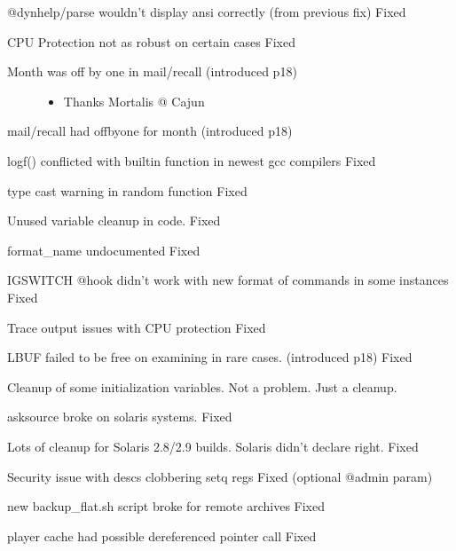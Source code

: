 \documentclass[letterpaper,10pt,english]{sphinxmanual}
\begin{document}
\sphinxAtStartPar
@dynhelp/parse wouldn’t display ansi correctly (from previous fix) \sphinxhyphen{} Fixed

\sphinxAtStartPar
CPU Protection not as robust on certain cases \sphinxhyphen{} Fixed
\begin{description}
\item[{Month was off by one in mail/recall (introduced p18)}] \leavevmode\begin{itemize}
\item {} 
\sphinxAtStartPar
Thanks Mortalis @ Cajun

\end{itemize}

\end{description}

\sphinxAtStartPar
mail/recall had off\sphinxhyphen{}by\sphinxhyphen{}one for month (introduced p18)

\sphinxAtStartPar
logf() conflicted with built\sphinxhyphen{}in function in newest gcc compilers \sphinxhyphen{} Fixed

\sphinxAtStartPar
type cast warning in random function \sphinxhyphen{} Fixed

\sphinxAtStartPar
Unused variable cleanup in code. \sphinxhyphen{} Fixed

\sphinxAtStartPar
format\_name undocumented \sphinxhyphen{} Fixed

\sphinxAtStartPar
IGSWITCH @hook didn’t work with new format of commands in some instances \sphinxhyphen{} Fixed

\sphinxAtStartPar
Trace output issues with CPU protection \sphinxhyphen{} Fixed

\sphinxAtStartPar
LBUF failed to be free on examining in rare cases. (introduced p18) \sphinxhyphen{} Fixed

\sphinxAtStartPar
Cleanup of some initialization variables.  Not a problem.  Just a cleanup.

\sphinxAtStartPar
asksource broke on solaris systems. \sphinxhyphen{} Fixed

\sphinxAtStartPar
Lots of cleanup for Solaris 2.8/2.9 builds.  Solaris didn’t declare right. \sphinxhyphen{} Fixed

\sphinxAtStartPar
Security issue with descs clobbering setq regs \sphinxhyphen{} Fixed (optional @admin param)

\sphinxAtStartPar
new backup\_flat.sh script broke for remote archives \sphinxhyphen{} Fixed

\sphinxAtStartPar
player cache had possible dereferenced pointer call \sphinxhyphen{} Fixed
\end{document}
